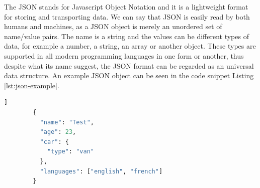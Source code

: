 The JSON stands for Javascript Object Notation and it is a lightweight format for storing and transporting data. We can say that JSON is easily read by both humans and machines, as a JSON object is merely an unordered set of name/value pairs. The name is a string and the values can be different types of data, for example a number, a string, an array or another object. These types are supported in all modern programming languages in one form or another, thus despite what its name suggest, the JSON format can be regarded as an universal data structure. An example JSON object can be seen in the code snippet Listing \ref{lst:json-example}.

\begin{center}
	\begin{minipage}{0.6\linewidth}
		\begin{lstlisting}[language=Python, caption={Example JSON}, label={lst:json-example}]]
		{
		  "name": "Test",
		  "age": 23,
		  "car": {
		    "type": "van"
		  },
		  "languages": ["english", "french"]
		}
		\end{lstlisting}
	\end{minipage}
\end{center}





